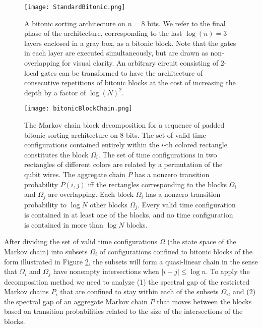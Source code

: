 \documentclass[11pt,letterpaper]{article}
\theoremstyle{definition}
\theoremstyle{remark}
\renewcommand{\leq}{\leqslant}
\numberwithin{equation}{section}
\theoremstyle{definition}
\begin{document}
\begin{figure}[h!]
\begin{center}
\texttt{[image: StandardBitonic.png]}
\end{center}
\caption{A bitonic sorting architecture on $n = 8$ bits. We refer to the final phase of the architecture, corresponding to the last $\log(n) = 3$ layers enclosed in a gray box, as a bitonic block.  Note that the gates in each layer are executed simultaneously, but are drawn as non-overlapping for visual clarity.  An arbitrary circuit consisting of 2-local gates can be transformed to have the architecture of consecutive repetitions of bitonic blocks \iffalse (Lemma \ref{lem:permforspaciallylocal})\fi at the cost of increasing the depth by a factor of $\log(N)^2$.  \label{fig:bb3}}
\end{figure}
\begin{figure}[h!]

\begin{center}
\texttt{[image: bitonicBlockChain.png]}
\end{center}
\caption{The Markov chain block decomposition for a sequence of padded bitonic sorting architecture on 8 bits. The set of valid time configurations contained entirely within the $i$-th colored rectangle constitutes the block $\Omega_i$.  The set of time configurations in two rectangles of different colors are related by a permutation of the qubit wires.  The aggregate chain $\overline{P}$ has a nonzero transition probability $\overline{P}(i,j)$ iff the rectangles corresponding to the blocks $\Omega_i$ and $\Omega_j$ are overlapping.  Each block $\Omega_i$ has a nonzero transition probability to $\log N$ other blocks $\Omega_j$.   Every valid time configuration is contained in at least one of the blocks, and no time configuration is contained in more than $\log N$ blocks. \label{fig:bitonicBlockChain}}
\end{figure}
After dividing the set of valid time configurations $\Omega$ (the state space of the Markov chain) into subsets $\Omega_i$ of configurations confined to bitonic blocks of the form illustrated in Figure \ref{fig:bitonicBlockChain}, the subsets will form a quasi-linear chain in the sense that $\Omega_i$ and $\Omega_j$ have nonempty intersections when $|i - j| \leq \log n$.  To apply the decomposition method we need to analyze (1) the spectral gap of the restricted Markov chains $P_i$ that are confined to stay within each of the subsets $\Omega_i$, and (2) the spectral gap of an aggregate Markov chain $\overline{P}$ that moves between the blocks based on transition probabilities related to the size of the intersections of the blocks.  
\end{document}
